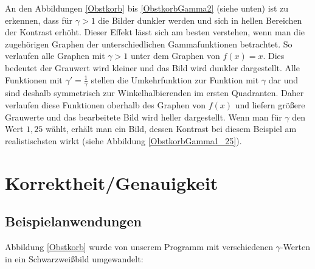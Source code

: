 \documentclass[course=erap]{aspdoc}
\begin{document}
	\noindent An den Abbildungen \ref{Obstkorb} bis \ref{ObstkorbGamma2} (siehe unten) ist zu erkennen, dass für $\gamma > 1$ die Bilder dunkler werden und sich in hellen Bereichen der Kontrast erhöht. Dieser Effekt lässt sich am besten verstehen, wenn man die zugehörigen Graphen der unterschiedlichen Gammafunktionen betrachtet. So verlaufen alle Graphen mit $\gamma > 1$  unter dem Graphen von $f(x)=x$. Dies bedeutet der Grauwert wird kleiner und das Bild wird dunkler dargestellt. Alle Funktionen mit $\gamma ' = \frac{1}{\gamma}$ stellen die Umkehrfunktion zur Funktion mit $\gamma$ dar und sind deshalb symmetrisch zur Winkelhalbierenden im ersten Quadranten. Daher verlaufen diese Funktionen oberhalb des Graphen von $f(x)$ und liefern größere Grauwerte und das bearbeitete Bild wird heller dargestellt. Wenn man für $\gamma$ den Wert $1,25$ wählt, erhält man ein Bild, dessen Kontrast bei diesem Beispiel am realistischsten wirkt (siehe Abbildung \ref{ObstkorbGamma1_25}).\\  
	
	\section{Korrektheit/Genauigkeit}
	 
	\subsection{Beispielanwendungen}
	Abbildung \ref{Obstkorb} wurde von unserem Programm mit verschiedenen $\gamma$-Werten in ein Schwarzweißbild umgewandelt:
	
\end{document}
